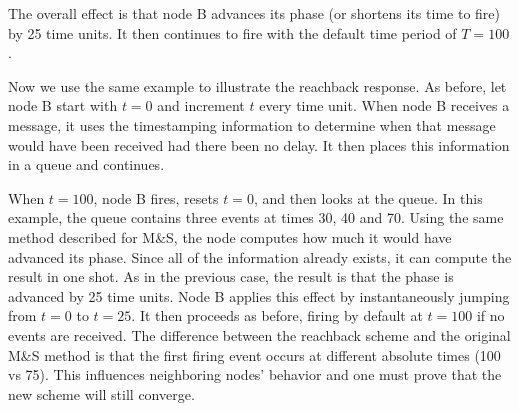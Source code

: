 \documentclass{sig-alternate}
\begin{document}
{The overall effect is that node B advances its phase (or shortens
its time to fire) by 25 time units. It then continues to fire with the
default time period of $T=100$.


Now we use the same example to illustrate the reachback response. As
before, let node B start with $t=0$ and increment $t$ every time
unit. When node B receives a message, it uses the timestamping
information to determine when that message would have been received
had there been no delay. It then places this information in a queue
and continues.

When $t=100$, node B fires, resets $t=0$, and then looks at the
queue. In this example, the queue contains three events at times 30,
40 and 70. Using the same method described for M\&S, the node computes
how much it would have advanced its phase. Since all of the
information already exists, it can compute the result in one shot.  As
in the previous case, the result is that the phase is advanced by 25
time units. Node B applies this effect by instantaneously jumping from
$t=0$ to $t=25$. It then proceeds as before, firing by default at
$t=100$ if no events are received. The difference between the
reachback scheme and the original M\&S method is that the first firing
event occurs at different absolute times (100 vs 75). This influences
neighboring nodes' behavior and one must prove that the new scheme will
still converge.






}
\end{document}
